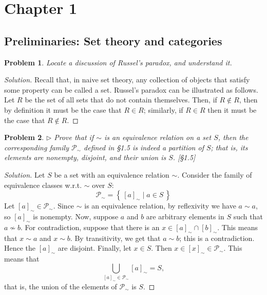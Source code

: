 \documentclass[fontsize=14pt]{scrartcl}
\newtheorem{problem-internal}{Problem}[subsection]
\newenvironment{problem}{
  \medskip
  \begin{problem-internal}
}{
  \end{problem-internal}
}
\newenvironment{solution}{
  \begin{proof}[Solution]
  \vspace{-8px}
  \setlength{\parskip}{4px}
  \setlength{\parindent}{0px}
}{
  \end{proof}
}
\newcommand{\set}[1]{\left\{\,#1\,\right\}}
\begin{document}



\section{Chapter 1}
\subsection{Preliminaries: Set theory and categories}


\begin{problem}
Locate a discussion of Russel's paradox, and understand it.
\end{problem}
\begin{solution}
Recall that, in naive set theory, any collection of objects
that satisfy some property can be called a set. Russel's paradox can be
illustrated as follows.  Let $R$ be the set of all sets that do not contain
themselves. Then, if $R\notin R$, then by definition it must be the case that
$R\in R$; similarly, if $R\in R$ then it must be the case that $R\notin R$.
\end{solution}


\begin{problem}
$\rhd$ Prove that if $\sim$ is an equivalence relation on a set $S$, then
the corresponding family $\mathscr{P}_{\sim}$ defined in \S1.5 is indeed a
partition of $S$; that is, its elements are nonempty, disjoint, and their union
is $S$. [\S1.5]
\end{problem}

\begin{solution}
Let $S$ be a set with an equivalence relation $\sim$.
Consider the family of equivalence classes w.r.t. $\sim$ over $S$:
%
\[ \mathscr{P}_{\sim} = \set{[a]_{\sim} \mid a\in S} \]
%
Let $[a]_{\sim}\in\mathscr{P}_{\sim}$. Since $\sim$ is an equivalence relation,
by reflexivity we have $a\sim a$, so $[a]_{\sim}$ is nonempty. Now, suppose
$a$ and $b$ are arbitrary elements in $S$ such that $a\not\sim b$. For
contradiction, suppose that there is an $x\in [a]_{\sim}\cap[b]_{\sim}$. This
means that $x\sim a$ and $x\sim b$. By transitivity, we get that $a\sim b$; this
is a contradiction. Hence the $[a]_{\sim}$ are disjoint. Finally, let $x\in S$.
Then $x\in[x]_{\sim}\in \mathscr{P}_{\sim}$. This means that
%
\[ \bigcup_{[a]_{\sim} \in \mathscr{P}_{\sim}} [a]_{\sim} = S, \]
%
that is, the union of the elements of $\mathscr{P}_{\sim}$ is $S$.
\end{solution}
\end{document}
